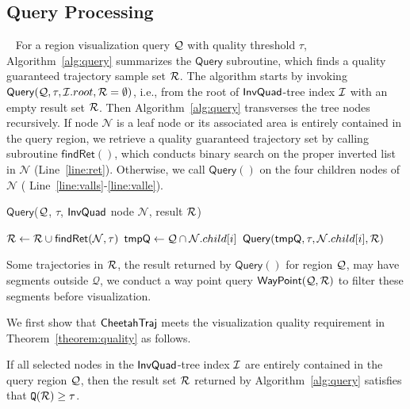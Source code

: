 \subsection{Query Processing}~\label{sec:query}
For a region visualization query $\mathcal{Q}$ with quality threshold $\tau$, Algorithm~\ref{alg:query} summarizes the $\mathsf{Query}$ subroutine, which finds a quality guaranteed trajectory sample set $\mathcal{R}$. The algorithm starts by invoking $\mathsf{Query}(\mathcal{Q}, \tau, \mathcal{I}.root, \mathcal{R}=\emptyset)$, i.e., from the root of $\mathsf{InvQuad}$-tree index $\mathcal{I}$ with an empty result set $\mathcal{R}$. Then Algorithm~\ref{alg:query} transverses the tree nodes recursively. If node   $\mathcal{N}$ is a leaf node or its associated area is entirely contained in the query region, we retrieve a quality guaranteed trajectory set by calling subroutine $\mathsf{findRet}()$, which conducts binary search on the proper inverted list in $\mathcal{N}$ (Line~\ref{line:ret}). Otherwise, we call $\mathsf{Query}()$ on the four children nodes of $\mathcal{N}$ ( Line~\ref{line:valls}-\ref{line:valle}).


\begin{algorithm}
	\caption{$\mathsf{Query}$($\mathcal{Q}$, $\tau$, $\mathsf{InvQuad}$ node $\mathcal{N}$, result $\mathcal{R}$)}
	\label{alg:query}
	\begin{algorithmic}[1]
            \State $\mathcal{R} \leftarrow \mathcal{R} \cup \mathsf{findRet}(\mathcal{N}, \tau)$ \label{line:ret}
         \label{line:valls}
                \State $\mathsf{tmpQ} \leftarrow \mathcal{Q} \cap \mathcal{N}.child[i]$
                \State $\mathsf{Query}(\mathsf{tmpQ}, \tau, \mathcal{N}.child[i], \mathcal{R})$
            \EndFor \label{line:valle}
        \EndIf
	\end{algorithmic}
\end{algorithm}

Some trajectories in $\mathcal{R}$, the result returned by $\mathsf{Query}()$ for region $\mathcal{Q}$, may have segments outside $\mathcal{Q}$,
we conduct a way point query $\mathsf{WayPoint}(\mathcal{Q}, \mathcal{R})$ to filter these segments before visualization.
%

We first show that $\mathsf{CheetahTraj}$ meets the visualization quality requirement in Theorem~\ref{theorem:quality} as follows.

\begin{theorem}\label{theorem:quality}
If all selected nodes in the $\mathsf{InvQuad}$-tree index $\mathcal{I}$ are entirely contained in the query region $\mathcal{Q}$,
then the result set $\mathcal{R}$ returned by Algorithm~\ref{alg:query} satisfies that $\mathtt{Q}(\mathcal{R}) \ge \tau$.
\end{theorem}

